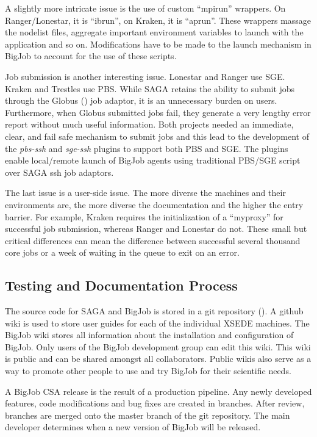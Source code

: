 \documentclass{sig-alternate}
\begin{document}
A slightly more intricate issue is the use of custom ``mpirun'' wrappers. On
Ranger/Lonestar, it is ``ibrun'', on Kraken, it is ``aprun''. These wrappers
massage the nodelist files, aggregate important environment variables to launch
with the application and so on. Modifications have to be made to the launch
mechanism in BigJob to account for the use of these scripts.

Job submission is another interesting issue. Lonestar and Ranger use SGE. 
Kraken and Trestles use PBS. While SAGA retains the ability to submit jobs
through the Globus (\cite{Globus}) job adaptor, it is an unnecessary burden on
users. Furthermore, when Globus submitted jobs fail, they generate a very
lengthy error report without much useful information. Both projects needed an
immediate, clear, and fail safe mechanism to submit jobs and this lead to the
development of the \textit{pbs-ssh} and \textit{sge-ssh} plugins to support both
PBS and SGE. The plugins enable local/remote launch of BigJob agents using
traditional PBS/SGE script over SAGA ssh job adaptors.

The last issue is a user-side issue. The more diverse the machines and their
environments are, the more diverse the documentation and the higher the entry
barrier. For example, Kraken requires the initialization of a ``myproxy'' for
successful job submission, whereas Ranger and Lonestar do not. These small  but
critical differences can mean the difference between successful several thousand
core jobs or a week of waiting in the queue to exit on an error.


\subsection{Testing and Documentation Process}

The source code for SAGA and BigJob is stored in a
git repository (\cite{bigjob_web}). A github wiki is used to store user guides
for each of the individual XSEDE machines. The BigJob wiki stores all
information about the installation and configuration of BigJob. Only users of
the BigJob development group can edit this wiki. This wiki is public and can be
shared amongst all collaborators. Public wikis also serve as a way to promote
other people to use and try BigJob for their scientific needs.

A BigJob CSA release is the result of a production pipeline. Any newly developed
features, code modifications and bug fixes are created in branches. After
review, branches are merged onto the master branch of the git repository. The
main developer determines when a new version of BigJob will be released. 
\end{document}
